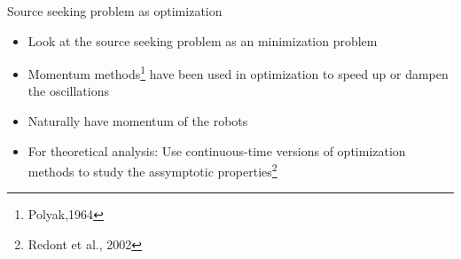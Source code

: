 \begin{frame}{Source seeking problem as optimization}
\begin{itemize}
	\item Look at the source seeking problem as an minimization problem
	\item Momentum methods\footnote{Polyak,1964} have been used in optimization to speed up or dampen the oscillations
	\item Naturally have momentum of the robots   
	\item For theoretical analysis: Use continuous-time versions of optimization methods to study the assymptotic properties\footnote{Redont et al., 2002} 
\end{itemize}
\end{frame}

